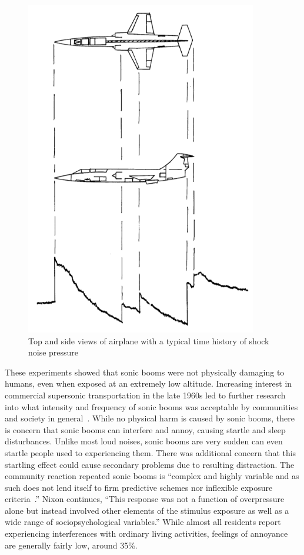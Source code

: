 \documentclass[]{aiaa-tc}%
\begin{document}
\begin{figure}[tb!]
  \centering
  \includegraphics[width=0.9\textwidth]{figs/plane-shock-config.png}
  \caption{Top and side views of airplane with a typical time history of shock noise pressure~\cite{maglieri1961ground}}
  \label{fig:shock_config}
\end{figure}

These experiments showed that sonic booms were not physically damaging to humans, even when exposed at an extremely low altitude. Increasing interest in commercial supersonic transportation in the late 1960s led to further research into what intensity and frequency of sonic booms was acceptable by communities and society in general~\cite{nixon1965results, power1964sonic, nixon1966effects}. While no physical harm is caused by sonic booms, there is concern that sonic booms can interfere and annoy, causing startle and sleep disturbances. Unlike most loud noises, sonic booms are very sudden can even startle people used to experiencing them. There was additional concern that this startling effect could cause secondary problems due to resulting distraction. The community reaction repeated sonic booms is ``complex and highly variable and as such does not lend itself to firm predictive schemes nor inflexible exposure criteria~\cite{nixon1966effects}.'' Nixon continues, ``This response was not a function of overpressure alone but instead involved other elements of the stimulus exposure as well as a wide range of sociopsychological variables.'' While almost all residents report experiencing interferences with ordinary living activities, feelings of annoyance are generally fairly low, around 35\%.
\end{document}
